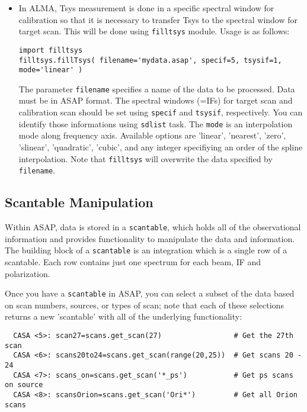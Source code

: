 \begin{itemize}
\item In ALMA, Tsys measurement is done in a specific spectral window
for calibration so that it is necessary to transfer Tsys to the
spectral window for target scan. This will be done using {\tt filltsys}
module. Usage is as follows:
\begin{verbatim}
import filltsys
filltsys.fillTsys( filename='mydata.asap', specif=5, tsysif=1, mode='linear' )
\end{verbatim}
The parameter {\tt filename} specifies a name of the data to be
processed. Data must be in ASAP format. The spectral windows (=IFs) for
target scan and calibration scan should be set using {\tt specif} and
{\tt tsysif}, respectively. You can identify those informations using
{\tt sdlist} task. The {\tt mode} is an interpolation mode along
frequency axis. Available options are 'linear', 'nearest', 'zero',
'slinear', 'quadratic', 'cubic', and any integer specifiying an order
of the spline interpolation.
Note that {\tt filltsys} will overwrite the data specified by
{\tt filename}. 

\end{itemize}



\subsection{Scantable Manipulation}
\label{subsection:sd.asap.scantable}

Within ASAP, data is stored in a {\tt scantable}, which holds all of the
observational information and provides functionality to manipulate the
data and information. The building block of a {\tt scantable} is an
integration which is a single row of a scantable. Each row contains
just one spectrum for each beam, IF and polarization.  

Once you have a {\tt scantable} in ASAP, you can select a subset of the
data based on scan numbers, sources, or types of scan; note that each
of these selections returns a new 'scantable' with all of the 
underlying functionality: 

\small
\begin{verbatim}
  CASA <5>: scan27=scans.get_scan(27)                 # Get the 27th scan
  CASA <6>: scans20to24=scans.get_scan(range(20,25))  # Get scans 20 - 24
  CASA <7>: scans_on=scans.get_scan('*_ps')           # Get ps scans on source
  CASA <8>: scansOrion=scans.get_scan('Ori*')         # Get all Orion scans
\end{verbatim}
\normalsize

